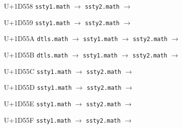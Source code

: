 \documentclass{article}
\begin{document}
\begin{substitutions}
\goodbreak

U+1D558  \linebreak
    \texttt{ssty1.math} $\to$  \linebreak
    \texttt{ssty2.math} $\to$  

\goodbreak

U+1D559  \linebreak
    \texttt{ssty1.math} $\to$  \linebreak
    \texttt{ssty2.math} $\to$  

\goodbreak

U+1D55A  \linebreak
    \texttt{dtls.math} $\to$  \linebreak
    \texttt{ssty1.math} $\to$  \linebreak
    \texttt{ssty2.math} $\to$  

\goodbreak

U+1D55B  \linebreak
    \texttt{dtls.math} $\to$  \linebreak
    \texttt{ssty1.math} $\to$  \linebreak
    \texttt{ssty2.math} $\to$  

\goodbreak

U+1D55C  \linebreak
    \texttt{ssty1.math} $\to$  \linebreak
    \texttt{ssty2.math} $\to$  

\goodbreak

U+1D55D  \linebreak
    \texttt{ssty1.math} $\to$  \linebreak
    \texttt{ssty2.math} $\to$  

\goodbreak

U+1D55E  \linebreak
    \texttt{ssty1.math} $\to$  \linebreak
    \texttt{ssty2.math} $\to$  

\goodbreak

U+1D55F  \linebreak
    \texttt{ssty1.math} $\to$  \linebreak
    \texttt{ssty2.math} $\to$  


\end{substitutions}
\end{document}
